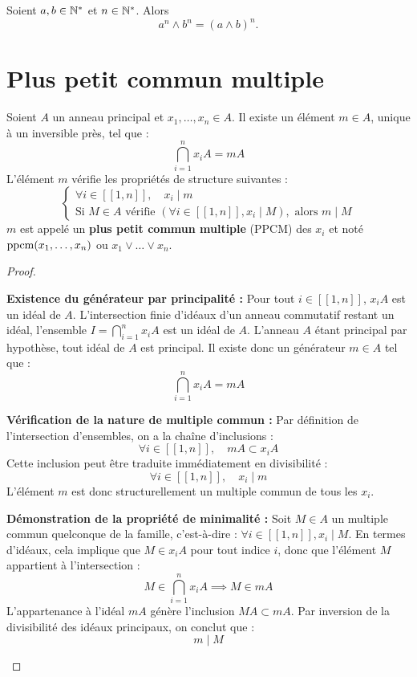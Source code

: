 \documentclass[12pt, a4paper]{report}
\begin{document}
\begin{remark}[PGCD de $a^n,b^n$]
    Soient $a,b \in \mathbb{N}^*$ et $n \in \mathbb{N}^*$. Alors
    \[
        a^n \wedge b^n = (a \wedge b)^n.
    \]
\end{remark}

\chapter{Plus petit commun multiple}

\begin{definition}
    Soient $A$ un anneau principal et $x_1,\dots,x_n \in A$.
    Il existe un élément $m \in A$, unique à un inversible près, tel que :
    $$ \bigcap_{i=1}^n x_i A = mA $$
    L'élément $m$ vérifie les propriétés de structure suivantes :
    $$ \begin{cases} \forall i \in [\![1, n]\!], \quad x_i \mid m \\ \text{Si } M \in A \text{ vérifie } (\forall i \in [\![1, n]\!], x_i \mid M), \text{ alors } m \mid M \end{cases} $$
    $m$ est appelé un \textbf{plus petit commun multiple} (PPCM) des $x_i$ et noté $\mathrm{ppcm}(x_1,\dots,x_n)$ ou $x_1 \vee \dots \vee x_n$.
\end{definition}

\begin{proof}
    \begin{outline}
        \1 \textbf{Existence du générateur par principalité :}
            \2 Pour tout $i \in [\![1, n]\!]$, $x_i A$ est un idéal de $A$. L'intersection finie d'idéaux d'un anneau commutatif restant un idéal, l'ensemble $I = \bigcap_{i=1}^n x_i A$ est un idéal de $A$.
            \2 L'anneau $A$ étant principal par hypothèse, tout idéal de $A$ est principal. Il existe donc un générateur $m \in A$ tel que :
               \[ \bigcap_{i=1}^n x_i A = mA \]

        \1 \textbf{Vérification de la nature de multiple commun :}
            \2 Par définition de l'intersection d'ensembles, on a la chaîne d'inclusions :
               \[ \forall i \in [\![1, n]\!], \quad mA \subset x_i A \]
            \2 Cette inclusion peut être traduite immédiatement en divisibilité :
               \[ \forall i \in [\![1, n]\!], \quad x_i \mid m \]
            \2 L'élément $m$ est donc structurellement un multiple commun de tous les $x_i$.

        \1 \textbf{Démonstration de la propriété de minimalité :}
            \2 Soit $M \in A$ un multiple commun quelconque de la famille, c'est-à-dire : $\forall i \in [\![1, n]\!], x_i \mid M$.
            \2 En termes d'idéaux, cela implique que $M \in x_i A$ pour tout indice $i$, donc que l'élément $M$ appartient à l'intersection :
               \[ M \in \bigcap_{i=1}^n x_i A \implies M \in mA \]
            \2 L'appartenance à l'idéal $mA$ génère l'inclusion $MA \subset mA$. Par inversion de la divisibilité des idéaux principaux, on conclut que :
               \[ m \mid M \]
    \end{outline}
\end{proof}
\end{document}

